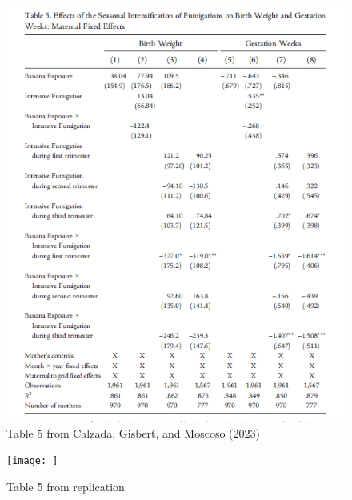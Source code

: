 \documentclass[hyperref={pdfpagelabels=false}]{beamer}
\begin{document}
	\begin{frame}{}
		
		\begin{figure}
			\centering
			\includegraphics[scale=0.4]{figures-paper/table5.png}
			\caption{Table 5 from Calzada, Gisbert, and Moscoso (2023)}
			\label{fig:enter-label}
		\end{figure}
		
	\end{frame}
	
	\begin{frame}{}
		
		\begin{figure}
			\centering
			\texttt{[image: ]}
			\caption{Table 5 from  replication}
			\label{fig:enter-label}
		\end{figure}
		
		
	\end{frame}
	
	
\end{document}

